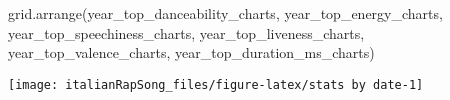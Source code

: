 \documentclass[
]{article}
\newenvironment{Shaded}{\begin{snugshade}}{\end{snugshade}}
\newcommand{\FunctionTok}[1]{\textcolor[rgb]{0.00,0.00,0.00}{#1}}
\newcommand{\NormalTok}[1]{#1}
\begin{document}
\begin{Shaded}
\begin{Highlighting}[]
\FunctionTok{grid.arrange}\NormalTok{(year\_top\_danceability\_charts,}
\NormalTok{             year\_top\_energy\_charts, }
\NormalTok{             year\_top\_speechiness\_charts, }
\NormalTok{             year\_top\_liveness\_charts,}
\NormalTok{             year\_top\_valence\_charts,}
\NormalTok{             year\_top\_duration\_ms\_charts)}
\end{Highlighting}
\end{Shaded}

\begin{center}\texttt{[image: italianRapSong\_files/figure-latex/stats by date-1]} \end{center}
\end{document}
